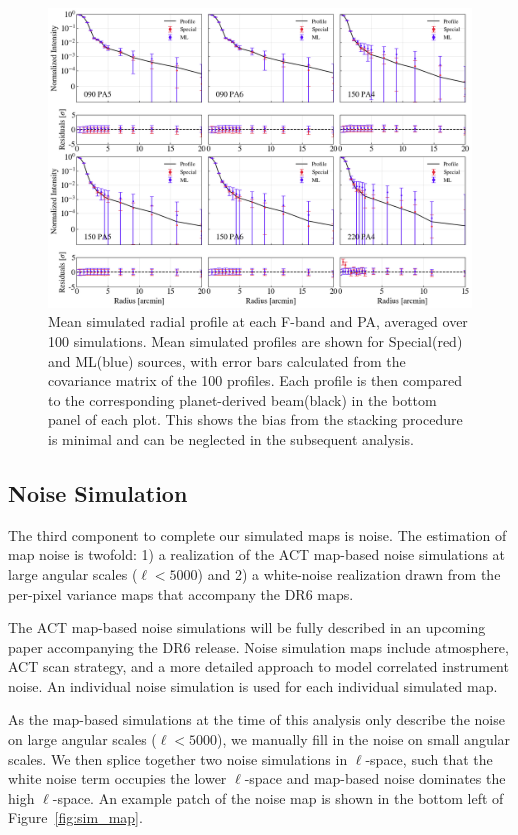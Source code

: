 \begin{figure}[t]
    \centering
    \includegraphics[width=\textwidth]{Figures/profiles_sims.png}
    \caption{Mean simulated radial profile at each F-band and PA, averaged over 100 simulations.  Mean simulated profiles are shown for Special(red) and ML(blue) sources, with error bars calculated from the covariance matrix of the 100 profiles.  Each profile is then compared to the corresponding planet-derived beam(black) in the bottom panel of each plot.  This shows the bias from the stacking procedure is minimal and can be neglected in the subsequent analysis.}
    \label{fig:simprofs}
\end{figure}

\subsection{Noise Simulation}
\label{subsec:sim_noise}
The third component to complete our simulated maps is noise.  The estimation of map noise is twofold: 1) a realization of the ACT map-based noise simulations at large angular scales ($\ell<5000$) and 2) a white-noise realization drawn from the per-pixel variance maps that accompany the DR6 maps.

The ACT map-based noise simulations will be fully described in an upcoming paper accompanying the DR6 release. Noise simulation maps include atmosphere, ACT scan strategy, and a more detailed approach to model correlated instrument noise.  An individual noise simulation is used for each individual simulated map.

As the map-based simulations at the time of this analysis only describe the noise on large angular scales ($\ell<5000$), we manually fill in the noise on small angular scales.  We then splice together two noise simulations in $\ell$-space, such that the white noise term occupies the lower $\ell$-space and map-based noise dominates the high $\ell$-space.  An example patch of the noise map is shown in the bottom left of Figure~\ref{fig:sim_map}.

